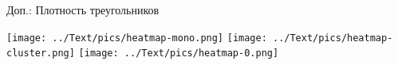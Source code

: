 \begin{frame}{Доп.: Плотность треугольников}
    \begin{center}
        \texttt{[image: ../Text/pics/heatmap-mono.png]}
        \texttt{[image: ../Text/pics/heatmap-cluster.png]}
        \texttt{[image: ../Text/pics/heatmap-0.png]}
    \end{center}
\end{frame}

